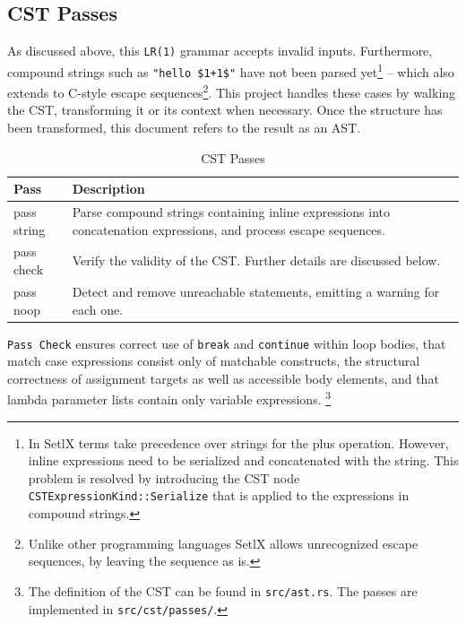 \subsection{CST Passes}

As discussed above, this \texttt{LR(1)} grammar accepts invalid inputs. Furthermore, compound strings such as \texttt{"hello \$1+1\$"} have not been parsed yet\footnote{
In SetlX terms take precedence over strings for the plus operation. However, inline expressions need to be serialized and concatenated with the string. This problem is resolved by introducing the \ac{CST} node \texttt{CSTExpressionKind::Serialize} that is applied to the expressions in compound strings.
} -- which also extends to C-style escape sequences\footnote{Unlike other programming languages SetlX allows unrecognized escape sequences, by leaving the sequence as is.}. This project handles these cases by walking the \ac{CST}, transforming it or its context when necessary. Once the structure has been transformed, this document refers to the result as an \acf{AST}.

\FloatBarrier

\begin{table}[h]
    \centering
    \caption{CST Passes}
    \renewcommand{\arraystretch}{1.3}
    \begin{tabular}{|p{3cm}|p{10cm}|}
        \hline
        \textbf{Pass} & \textbf{Description} \\
        \hline
        pass string & Parse compound strings containing inline expressions into concatenation expressions, and process escape sequences. \\
        \hline
        pass check & Verify the validity of the \ac{CST}. Further details are discussed below. \\
        \hline
        pass noop & Detect and remove unreachable statements, emitting a warning for each one. \\
        \hline
    \end{tabular}
\end{table}
\FloatBarrier

\texttt{Pass~Check} ensures correct use of \texttt{break} and \texttt{continue} within loop bodies, that match case expressions consist only of matchable constructs, the structural correctness of assignment targets as well as accessible body elements, and that lambda parameter lists contain only variable expressions.
\footnote{The definition of the CST can be found in \texttt{src/ast.rs}. The passes are implemented in \texttt{src/cst/passes/}.}

